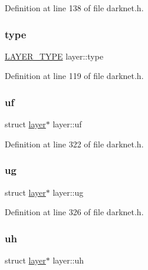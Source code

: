 Definition at line 138 of file darknet.\+h.

\mbox{\label{structlayer_af00e36adaf6e404a3e5234843c723714}} 
\subsubsection{\texorpdfstring{type}{type}}
{\footnotesize\ttfamily \mbox{\hyperlink{darknet_8h_a5f7e99058765b058df158c099200b154}{L\+A\+Y\+E\+R\+\_\+\+T\+Y\+PE}} layer\+::type}



Definition at line 119 of file darknet.\+h.

\mbox{\label{structlayer_a509fb446cc0040855b530840f4cc9aad}} 
\subsubsection{\texorpdfstring{uf}{uf}}
{\footnotesize\ttfamily struct \mbox{\hyperlink{structlayer}{layer}}$\ast$ layer\+::uf}



Definition at line 322 of file darknet.\+h.

\mbox{\label{structlayer_ad1a598647343ef1b791891b186dc9186}} 
\subsubsection{\texorpdfstring{ug}{ug}}
{\footnotesize\ttfamily struct \mbox{\hyperlink{structlayer}{layer}}$\ast$ layer\+::ug}



Definition at line 326 of file darknet.\+h.

\mbox{\label{structlayer_ae663063cf926ae0cb83b03113479ca2a}} 
\subsubsection{\texorpdfstring{uh}{uh}}
{\footnotesize\ttfamily struct \mbox{\hyperlink{structlayer}{layer}}$\ast$ layer\+::uh}



